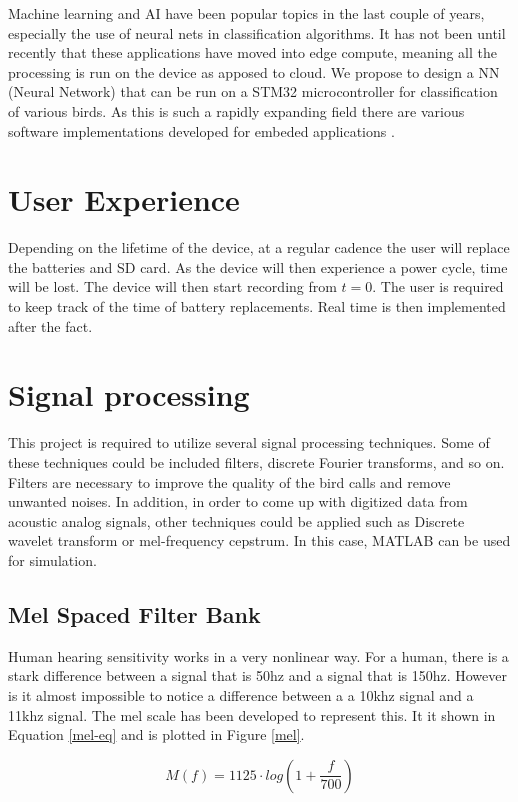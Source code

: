\documentclass[12pt,journal,compsoc]{IEEEtran}
\begin{document}
Machine learning and AI have been popular topics in the last couple of years, especially the use of neural nets in classification algorithms. It has not been until recently that these applications have moved into edge compute, meaning all the processing is run on the device as apposed to cloud. We propose to design a NN (Neural Network) that can be run on a STM32 microcontroller for classification of various birds. As this is such a rapidly expanding field there are various software implementations developed for embeded applications \cite{CMSIS} \cite{TF}. 


\section{User Experience}
Depending on the lifetime of the device, at a regular cadence the user will replace the batteries and SD card. As the device will then experience a power cycle, time will be lost. The device will then start recording from $t=0$. The user is required to keep track of the time of battery replacements. Real time is then implemented after the fact.

\section{Signal processing}
This project is required to utilize several signal processing techniques. Some of these techniques could be included filters, discrete Fourier transforms, and so on. Filters are necessary to improve the quality of the bird calls and remove unwanted noises. In addition, in order to come up with digitized data from acoustic analog signals, other techniques could be applied such as Discrete wavelet transform or mel-frequency cepstrum. In this case, MATLAB can be used for simulation.

\subsection{Mel Spaced Filter Bank}
Human hearing sensitivity works in a very nonlinear way. For a human, there is a stark difference between a signal that is 50hz and a signal that is 150hz. However is it almost impossible to notice a difference between a a 10khz signal and a 11khz signal. The mel scale has been developed to represent this. It it shown in Equation \ref{mel-eq} and is plotted in Figure \ref{mel}. 

\begin{equation}
M(f) = 1125 \cdot log(1+\frac{f}{700})
\label{mel-eq}
\end{equation}
\end{document}
